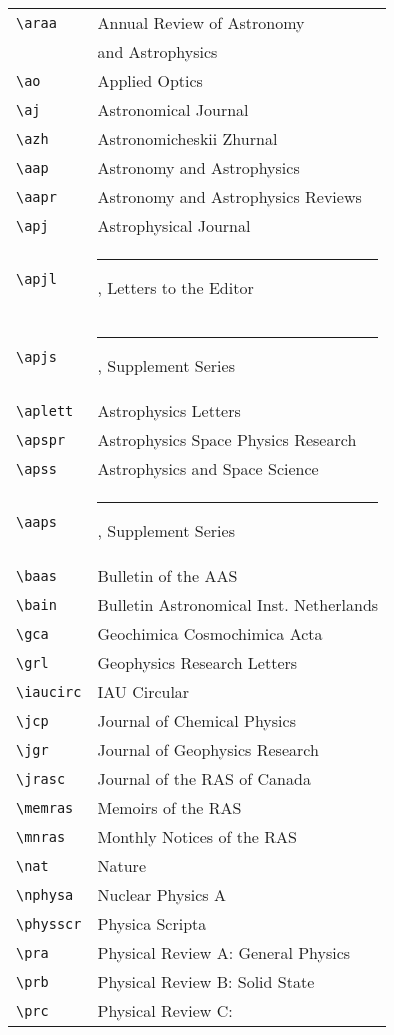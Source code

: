 \begin{center}
\begin{tabular}{ll}
\verb"\araa" & Annual Review of Astronomy\\
  & \hspace*{1em} and Astrophysics\\
\verb"\ao" & Applied Optics\\
\verb"\aj" & Astronomical Journal\\
\verb"\azh" & Astronomicheskii Zhurnal\\
\verb"\aap" & Astronomy and Astrophysics\\
\verb"\aapr" & Astronomy and Astrophysics Reviews\\
\verb"\apj" & Astrophysical Journal\\
\verb"\apjl" & \rule[.5ex]{2em}{.4pt}, Letters to the Editor\\
\verb"\apjs" & \rule[.5ex]{2em}{.4pt}, Supplement Series\\
\verb"\aplett" & Astrophysics Letters\\
\verb"\apspr" & Astrophysics Space Physics Research\\
\verb"\apss" & Astrophysics and Space Science\\
\verb"\aaps" & \rule[.5ex]{2em}{.4pt}, Supplement Series\\
\verb"\baas" & Bulletin of the AAS\\
\verb"\bain" & Bulletin Astronomical Inst. Netherlands\\
\verb"\gca" & Geochimica Cosmochimica Acta\\
\verb"\grl" & Geophysics Research Letters\\
\verb"\iaucirc" & IAU Circular\\
\verb"\jcp" & Journal of Chemical Physics\\
\verb"\jgr" & Journal of Geophysics Research\\
\verb"\jrasc" & Journal of the RAS of Canada\\
\verb"\memras" & Memoirs of the RAS\\
\verb"\mnras" & Monthly Notices of the RAS\\
\verb"\nat" & Nature\\
\verb"\nphysa" & Nuclear Physics A\\
\verb"\physscr" & Physica Scripta\\
\verb"\pra" & Physical Review A: General Physics\\
\verb"\prb" & Physical Review B: Solid State\\
\verb"\prc" & Physical Review C:\\

\end{tabular}
\end{center}
